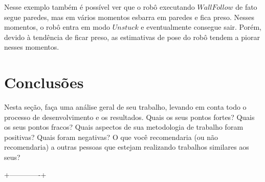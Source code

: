 \documentclass[twoside,conference,a4paper]{IEEEtran}
\begin{document}
Nesse exemplo também é possível ver que o robô executando $Wall Follow$ de fato segue paredes, mas em vários momentos esbarra em paredes e fica preso. Nesses momentos, o robô entra em modo $Unstuck$ e eventualmente consegue sair. Porém, devido à tendência de ficar preso, as estimativas de pose do robô tendem a piorar nesses momentos.

\section{Conclusões}

Nesta seção, faça uma análise geral de seu trabalho, levando em conta todo o processo de desenvolvimento e os resultados. Quais os seus pontos fortes? Quais os seus pontos fracos? Quais aspectos de sua metodologia de trabalho foram positivas? Quais foram negativas? O que você recomendaria (ou não recomendaria) a outras pessoas que estejam realizando trabalhos similares aos seus? 


 +-------------+





\end{document}
